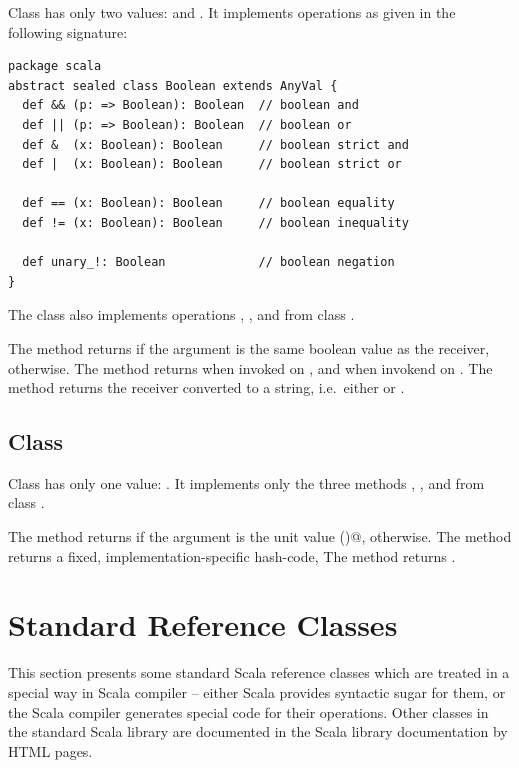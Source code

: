 {Class  has only two values:  and
. It implements operations as given in the following
signature:

\begin{lstlisting}
package scala 
abstract sealed class Boolean extends AnyVal {
  def && (p: => Boolean): Boolean  // boolean and
  def || (p: => Boolean): Boolean  // boolean or
  def &  (x: Boolean): Boolean     // boolean strict and
  def |  (x: Boolean): Boolean     // boolean strict or

  def == (x: Boolean): Boolean     // boolean equality
  def != (x: Boolean): Boolean     // boolean inequality

  def unary_!: Boolean             // boolean negation
}
\end{lstlisting}
The class also implements operations , ,
and  from class .

The  method returns  if the argument is the
same boolean value as the receiver,  otherwise.  The
 method returns  when invoked on , 
and  when invokend on . The  method
returns the receiver converted to a string, i.e.\ either 
or .

\subsection{Class \large{}}

Class  has only one value: \code{()}. It implements only
the three methods , , and 
from class .

The  method returns  if the argument is the
unit value \lstinline@()@,  otherwise.  The
 method returns a fixed, implementation-specific hash-code, 
The  method returns .

\section{Standard Reference Classes}
\label{cls:reference}

This section presents some standard Scala reference classes which are
treated in a special way in Scala compiler -- either Scala provides
syntactic sugar for them, or the Scala compiler generates special code
for their operations. Other classes in the standard Scala library are
documented in the Scala library documentation by HTML pages.

}
